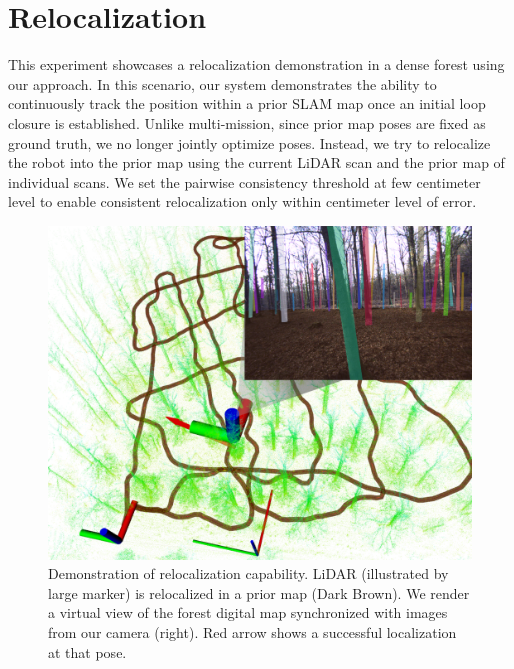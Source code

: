 \section{Relocalization} 
\label{sec:exp_relocalization}
This experiment showcases a relocalization demonstration in a dense forest using our approach. In this scenario, our system demonstrates the ability to continuously track the position within a prior SLAM map once an initial loop closure is established. Unlike multi-mission, since prior map poses are fixed as ground truth,  we no longer jointly optimize poses.
Instead, we try to relocalize the robot into the prior map using the current LiDAR scan and the prior map of individual scans. We set the pairwise consistency threshold at few centimeter level to enable consistent relocalization only within centimeter level of error. 
\begin{figure}[htbp]
  \centering
  \includegraphics[width=0.80\linewidth]{pics/exp_4_relocalization_demo.png}
  \caption{Demonstration of relocalization capability. LiDAR (illustrated by large marker) is relocalized in a prior map (Dark Brown). We render a virtual view of the forest digital map synchronized with images from our camera (right). Red arrow shows a successful localization at that pose.}
  \label{fig:relocalization_demo}
\end{figure}

